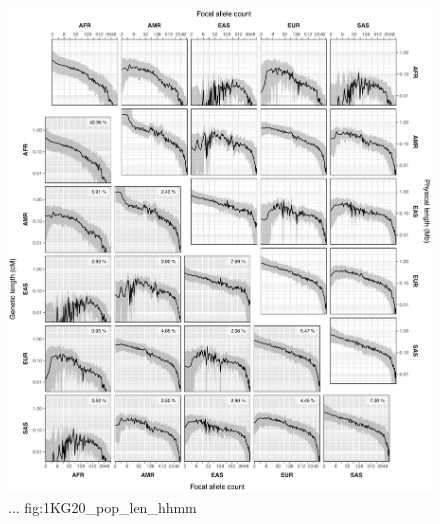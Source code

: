 

\begin{figure}[p]
\centering
\includegraphics[width=\textwidth]{./img/ch5/1KG20_pop_len_hhmm}
%
{...}%
{fig:1KG20_pop_len_hhmm}
\end{figure}
